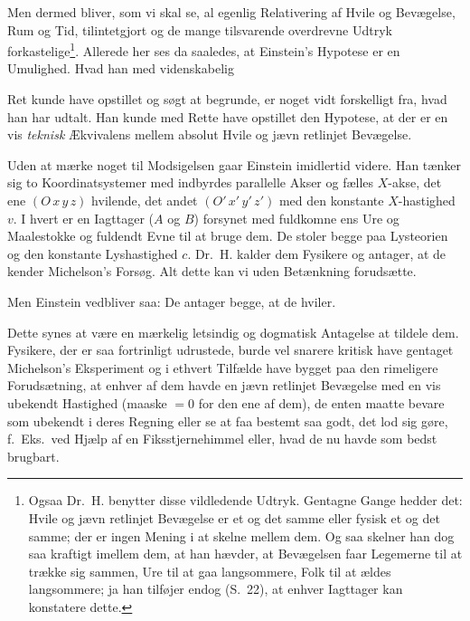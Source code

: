 \documentclass[12pt,a4paper]{article}
\renewcommand{\thefootnote}{*)}
\newcommand{\opage}[1]{\marginnote{\footnotesize\textit{[#1]}}}
\begin{document}
Men dermed bliver, som vi skal se, al egenlig Relativering af Hvile og
Bevægelse, Rum og Tid, tilintetgjort og de mange tilsvarende overdrevne Udtryk
forkastelige{\renewcommand{\thefootnote}{**)}\footnote{Ogsaa Dr.\ H. benytter
disse vildledende Udtryk. Gentagne Gange hedder det: Hvile og jævn retlinjet
Bevægelse er et og det samme eller fysisk et og det samme; der er ingen Mening
i at skelne mellem dem. Og saa skelner han dog saa kraftigt imellem dem, at han
hævder, at Bevægelsen faar Legemerne til at trække sig sammen, Ure til at gaa
langsommere, Folk til at ældes langsommere; ja han tilføjer endog (S.\ 22), at
enhver Iagttager kan konstatere dette.}}. Allerede her ses da saaledes, at
Einstein's Hypotese er en Umulighed. Hvad han med videnskabelig

\opage{199} Ret kunde have opstillet og søgt at begrunde, er noget vidt forskelligt fra,
hvad han har udtalt. Han kunde med Rette have opstillet den Hypotese, at der er
en vis \emph{teknisk} Ækvivalens mellem absolut Hvile og jævn retlinjet
Bevægelse.

Uden at mærke noget til Modsigelsen gaar Einstein imidlertid videre. Han
tænker sig to Koordinatsystemer med indbyrdes parallelle Akser og fælles
$X$-akse, det ene $(O\,x\,y\,z)$ hvilende, det andet $(O'\,x'\,y'\,z')$ med
den konstante $X$-hastighed $v$. I hvert er en Iagttager ($A$ og $B$) forsynet
med fuldkomne ens Ure og Maalestokke og fuldendt Evne til at bruge dem. De
stoler begge paa Lysteorien og den konstante Lyshastighed $c$. Dr.\ H. kalder
dem Fysikere og antager, at de kender Michelson's Forsøg. Alt dette kan vi uden
Betænkning forudsætte.

Men Einstein vedbliver saa: De antager begge, at de hviler.

Dette synes at være en mærkelig letsindig og dogmatisk Antagelse at tildele
dem. Fysikere, der er saa fortrinligt udrustede, burde vel snarere kritisk have
gentaget Michelson's Eksperiment og i ethvert Tilfælde have bygget paa den
rimeligere Forudsætning, at enhver af dem havde en jævn retlinjet Bevægelse med
en vis ubekendt Hastighed (maaske $= 0$ for den ene af dem), de enten maatte
bevare som ubekendt i deres Regning eller se at faa bestemt saa godt, det lod
sig gøre, f.\ Eks.\ ved Hjælp af en Fiksstjernehimmel eller, hvad de nu havde
som bedst brugbart.
\end{document}
